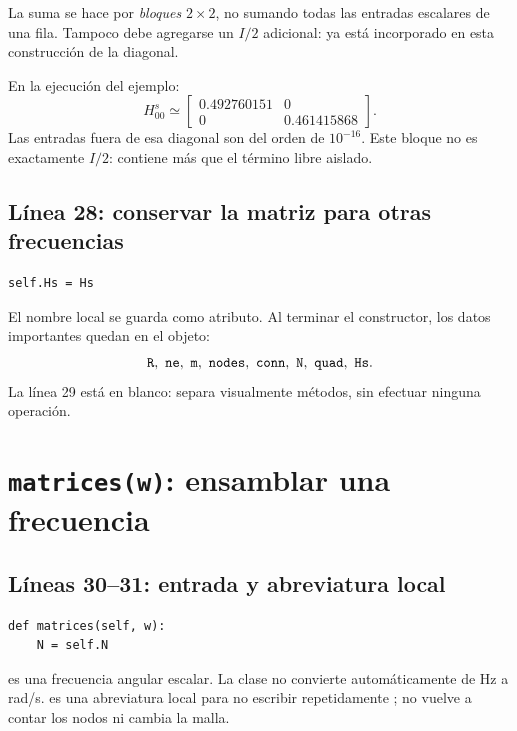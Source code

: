 \documentclass[11pt,a4paper]{article}
\numberwithin{equation}{section}
\DeclareRobustCommand{\code}[1]{\texttt{\detokenize{#1}}}
\begin{document}
\begin{cuidado}
La suma se hace por \emph{bloques} $2\times2$, no sumando todas las
entradas escalares de una fila.
Tampoco debe agregarse un $I/2$ adicional: ya est\'a incorporado
en esta construcci\'on de la diagonal.
\end{cuidado}

En la ejecuci\'on del ejemplo:
\begin{equation}
 H^s_{00}\simeq
 \begin{bmatrix}
 0.492760151&0\\
 0&0.461415868
 \end{bmatrix}.
 \label{eq:diag-ejemplo}
\end{equation}
Las entradas fuera de esa diagonal son del orden de $10^{-16}$.
Este bloque no es exactamente $I/2$: contiene m\'as que el t\'ermino
libre aislado.

\subsection{L\'inea 28: conservar la matriz para otras frecuencias}
\begin{lstlisting}
self.Hs = Hs
\end{lstlisting}
El nombre local \code{Hs} se guarda como atributo.
Al terminar el constructor, los datos importantes quedan en el objeto:
\begin{equation}
 \code{R},\ \code{ne},\ \code{m},\ \code{nodes},\
 \code{conn},\ \code{N},\ \code{quad},\ \code{Hs}.
\end{equation}
La l\'inea 29 est\'a en blanco: separa visualmente m\'etodos,
sin efectuar ninguna operaci\'on.

\section{\texttt{matrices(w)}: ensamblar una frecuencia}
\label{sec:matrices}
\subsection{L\'ineas 30--31: entrada y abreviatura local}
\begin{lstlisting}
def matrices(self, w):
    N = self.N
\end{lstlisting}
\code{w} es una frecuencia angular escalar. La clase no convierte
autom\'aticamente de Hz a rad/s.
\code{N} es una abreviatura local para no escribir repetidamente
\code{self.N}; no vuelve a contar los nodos ni cambia la malla.
\end{document}
